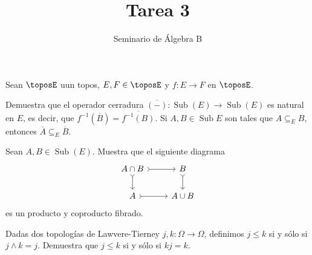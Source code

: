 \documentclass[article]{memoir}
\title{Tarea 3}
\author{Seminario de Álgebra B}
\date{}
\DeclareMathOperator{\sub}{Sub}
\begin{document}
\maketitle

\begin{exercise}
  Sean \(\toposE\) uun topos, \(E,F\in\toposE\) y \(f\colon E\to F\) en \(\toposE\).
  \begin{tasks}
    \task Demuestra que el operador cerradura \(\overline{(-)}\colon\sub(E)\to\sub(E)\) es natural en \(E\), es decir, que \(f^{-1}(\overline{B})=\overline{f^{-1}(B)}\).
    \task Si \(A,B\in\sub{E}\) son tales que \(A\subseteq_E B\), entonces \(\overline{A}\subseteq_E \overline{B}\). 
  \end{tasks}
\end{exercise}

\begin{exercise}
  Sean \(A,B\in\sub(E)\). Muestra que el siguiente diagrama
  \[
    \begin{tikzcd}[arrows=tail, ampersand replacement=\&]
      A\cap B\ar{r}\ar{d} \& B\ar{d}\\
      A\ar{r} \& A\cup B
    \end{tikzcd}
  \]
  es un producto y coproducto fibrado.
\end{exercise}

\begin{exercise}
  Dadas dos topologías de Lawvere-Tierney \(j,k\colon\Omega\to\Omega\), definimos \(j\leq k\) si y sólo si 
  \(j\land k=j\). Demuestra que \(j\leq k\) si y sólo si \(kj=k\).
\end{exercise}
\end{document}
